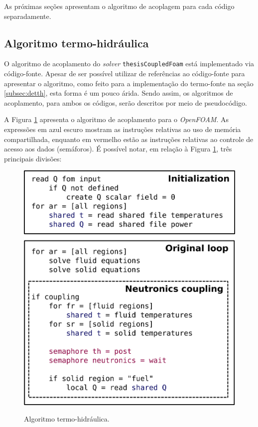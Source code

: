 As próximas seções apresentam o algoritmo de acoplagem para cada código separadamente.


\subsection{Algoritmo termo-hidráulica}
\label{subsec:th}

O algoritmo de acoplamento do \textit{solver} \texttt{thesisCoupledFoam} está implementado
via código-fonte. Apesar de ser possível utilizar de referências ao código-fonte para
apresentar o algoritmo, como feito para a implementação do termo-fonte na seção \ref{subsec:detth},
esta forma é um pouco árida. Sendo assim, os algoritmos de acoplamento, para ambos os códigos,
serão descritos por meio de pseudocódigo.

A Figura \ref{fig:algo_th} apresenta o algoritmo de acoplamento para o \textit{OpenFOAM}.
As expressões em azul escuro mostram as instruções relativas ao uso de memória compartilhada,
enquanto em vermelho estão as instruções relativas ao controle de acesso aos dados (semáforos).
É possível notar, em relação à Figura \ref{fig:algo_th}, três principais divisões:

\begin{figure}[htb]
  \caption{Algoritmo termo-hidráulica.}
  \centering\includegraphics[scale=0.5]{figuras/algoritmo_openfoam.png}
  \label{fig:algo_th}
\end{figure}

